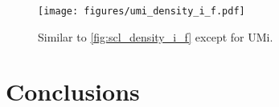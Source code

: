 \documentclass{aa}
\begin{document}
\begin{figure}
    \centering
    \texttt{[image: figures/umi\_density\_i\_f.pdf]}
    \caption{Similar to \ref{fig:scl_density_i_f} except for UMi.} 
\end{figure}


\section{Conclusions}



\begin{acknowledgements}
\end{acknowledgements}





%
%
%
%
%
%
%
%
\end{document}
